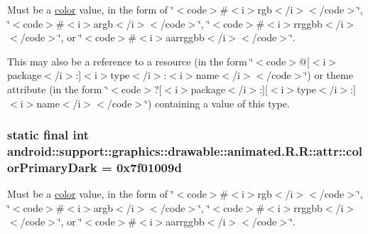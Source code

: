 Must be a \hyperlink{classandroid_1_1support_1_1graphics_1_1drawable_1_1animated_1_1_r_1_1color}{color} value, in the form of \char`\"{}$<$code$>$\#$<$i$>$rgb$<$/i$>$$<$/code$>$\char`\"{}, \char`\"{}$<$code$>$\#$<$i$>$argb$<$/i$>$$<$/code$>$\char`\"{}, \char`\"{}$<$code$>$\#$<$i$>$rrggbb$<$/i$>$$<$/code$>$\char`\"{}, or \char`\"{}$<$code$>$\#$<$i$>$aarrggbb$<$/i$>$$<$/code$>$\char`\"{}. 

This may also be a reference to a resource (in the form \char`\"{}$<$code$>$@\mbox{[}$<$i$>$package$<$/i$>$:\mbox{]}$<$i$>$type$<$/i$>$:$<$i$>$name$<$/i$>$$<$/code$>$\char`\"{}) or theme attribute (in the form \char`\"{}$<$code$>$?\mbox{[}$<$i$>$package$<$/i$>$:\mbox{]}\mbox{[}$<$i$>$type$<$/i$>$:\mbox{]}$<$i$>$name$<$/i$>$$<$/code$>$\char`\"{}) containing a value of this type. \hypertarget{classandroid_1_1support_1_1graphics_1_1drawable_1_1animated_1_1_r_1_1attr_047432d94a72e1f7f4d6b0d8cd627e8b}{
\subsubsection[{colorPrimaryDark}]{\setlength{\rightskip}{0pt plus 5cm}static final int android::support::graphics::drawable::animated.R.R::attr::colorPrimaryDark = 0x7f01009d}}
\label{classandroid_1_1support_1_1graphics_1_1drawable_1_1animated_1_1_r_1_1attr_047432d94a72e1f7f4d6b0d8cd627e8b}


Must be a \hyperlink{classandroid_1_1support_1_1graphics_1_1drawable_1_1animated_1_1_r_1_1color}{color} value, in the form of \char`\"{}$<$code$>$\#$<$i$>$rgb$<$/i$>$$<$/code$>$\char`\"{}, \char`\"{}$<$code$>$\#$<$i$>$argb$<$/i$>$$<$/code$>$\char`\"{}, \char`\"{}$<$code$>$\#$<$i$>$rrggbb$<$/i$>$$<$/code$>$\char`\"{}, or \char`\"{}$<$code$>$\#$<$i$>$aarrggbb$<$/i$>$$<$/code$>$\char`\"{}. 

